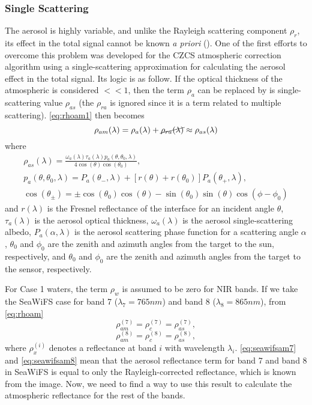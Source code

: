 \subsubsection{Single Scattering}
\label{subsubsec:singlescat}
The aerosol is highly variable, and unlike the Rayleigh scattering component $\rho_r$, its effect in the total signal cannot be known {\it a priori} (\cite{Gordon:1994}). One of the first efforts to overcome this problem was developed for the CZCS atmospheric correction algorithm using a single-scattering approximation for calculating the aerosol effect in the total signal. Its logic is as follow. If the optical thickness of the atmospheric is considered $<<1$, then the term $\rho_a$ can be replaced by is single-scattering value $\rho_{as}$ (the $\rho_{ra}$ is ignored since it is a term related to multiple scattering). \autoref{eq:rhoam1} then becomes
\begin{equation}\label{eq:singleapprox}
  \rho_{am}(\lambda) = \rho_a(\lambda)+\cancel{\rho_{ra}(\lambda)} \approx \rho_{as}(\lambda)
\end{equation}
where
\begin{equation}\label{eq:rhoas}
  \begin{gathered}
    \rho_{as}(\lambda) = \frac{\omega_a(\lambda)\tau_a(\lambda)p_a(\theta,\theta_0,\lambda)}{4\cos(\theta)\cos(\theta_0)},\\  
    p_a(\theta,\theta_0,\lambda) = P_a(\theta_{-},\lambda) + [r(\theta)+r(\theta_0)]P_a(\theta_{+},\lambda),\\
    \cos(\theta_{\pm}) = \pm \cos(\theta_0)\cos(\theta)-\sin(\theta_0)\sin(\theta)\cos(\phi-\phi_0)
  \end{gathered}
\end{equation}
and $r(\lambda)$ is the Fresnel reflectance of the interface for an incident angle $\theta$, $\tau_a(\lambda)$ is the aerosol optical thickness, $\omega_a(\lambda)$ is the aerosol single-scattering albedo, $P_a(\alpha,\lambda)$ is the aerosol scattering phase function for a scattering angle $\alpha$, $\theta_0$ and $\phi_0$ are the zenith and azimuth angles from the target to the sun, respectively, and $\theta_0$ and $\phi_0$ are the zenith and azimuth angles from the target to the sensor, respectively. 


For Case 1 waters, the term $\rho_{w}$ is assumed to be zero for NIR bands. If we take the SeaWiFS case for band 7 ($\lambda_7=765nm$) and band 8 ($\lambda_8=865nm$), from \autoref{eq:rhoam}
\begin{equation}\label{eq:seawifsam7}
    \rho_{am}^{(7)} = \rho_{c}^{(7)} = \rho_{as}^{(7)},
\end{equation}
\begin{equation}\label{eq:seawifsam8}
    \rho_{am}^{(8)} = \rho_{c}^{(8)} = \rho_{as}^{(8)},
\end{equation}
where $\rho_{x}^{(i)}$ denotes a reflectance at band $i$ with wavelength $\lambda_i$. \autoref{eq:seawifsam7} and \autoref{eq:seawifsam8} mean that the aerosol reflectance term for band 7 and band 8 in SeaWiFS is equal to only the Rayleigh-corrected reflectance, which is known from the image. Now, we need to find a way to use this result to calculate the atmospheric reflectance for the rest of the bands.


